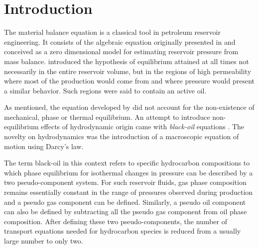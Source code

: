 \documentclass[final,authoryear,5p,times,twocolumn,10pt]{elsarticle}
\begin{document}
\section{Introduction}
The material balance equation is a classical tool in petroleum reservoir engineering. It consists of the algebraic equation originally presented in \cite{schilthuis1936active} and conceived as a zero dimensional model for estimating reservoir pressure from mass balance. \cite{schilthuis1936active} introduced the hypothesis of equilibrium attained at all times not necessarily in the entire reservoir volume, but in the regions of high permeability where most of the production would come from and where pressure would present a similar behavior. Such regions were said to contain an active oil.

As mentioned, the equation developed by \cite{schilthuis1936active} did not account for the non-existence of mechanical, phase or thermal equilibrium. An attempt to introduce non-equilibrium effects of hydrodynamic origin came with \textit{black-oil} equations \citep{aziz1979petroleum,blackoil}. The novelty on hydrodynamics was the introduction of a macroscopic equation of motion using Darcy's law. 


The term black-oil in this context refers to specific hydrocarbon compositions to which phase equilibrium for isothermal changes in pressure can be described by a two pseudo-component system. For such reservoir fluids, gas phase composition remains essentially constant in the range of pressures observed during production and a pseudo gas component can be defined. Similarly, a pseudo oil component can also be defined by subtracting all the pseudo gas component from oil phase composition. After defining these two pseudo-components, the number of transport equations needed for hydrocarbon species is reduced from a usually large number to only two.


\end{document}
